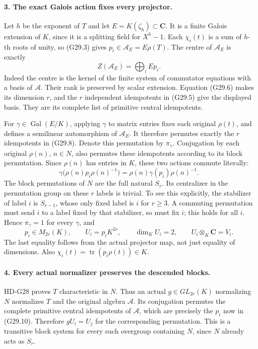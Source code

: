 \paragraph{3. The exact Galois action fixes every projector.}
Let \(h\) be the exponent of \(T\) and let
\(E=K(\zeta_h)\subset\mathbf C\). It is a finite Galois
extension of \(K\), since it is a splitting field for
\(X^h-1\). Each \(\chi_i(t)\) is a sum of \(h\)-th
roots of unity, so (G29.3) gives
\(p_i\in\mathcal A_E=E\rho(T)\).
The centre of \(\mathcal A_E\) is exactly
\[
                         Z(\mathcal A_E)=\bigoplus_i E p_i.
                                                               \tag{G29.8}
\]
Indeed the centre is the kernel of the finite system of
commutator equations with a basis of \(\mathcal A\).
Their rank is preserved by scalar extension. Equation
(G29.6) makes its dimension \(r\), and the \(r\)
independent idempotents in (G29.5) give the displayed basis.
They are its complete list of primitive central idempotents.

For \(\gamma\in\operatorname{Gal}(E/K)\), applying
\(\gamma\) to matrix entries fixes each original
\(\rho(t)\), and defines a semilinear automorphism of
\(\mathcal A_E\). It therefore permutes exactly the
\(r\) idempotents in (G29.8). Denote this permutation
by \(\pi_\gamma\). Conjugation by each original
\(\rho(n)\), \(n\in N\), also permutes these idempotents
according to its block permutation. Since \(\rho(n)\)
has entries in \(K\), these two actions commute literally:
\[
 \gamma\bigl(\rho(n)p_i\rho(n)^{-1}\bigr)
       =\rho(n)\gamma(p_i)\rho(n)^{-1}.                    \tag{G29.9}
\]
The block permutations of \(N\) are the full natural
\(S_r\). Its centralizer in the permutation group on
these \(r\) labels is trivial. To see this explicitly,
the stabilizer of label \(i\) is \(S_{r-1}\), whose
only fixed label is \(i\) for \(r\ge3\). A commuting
permutation must send \(i\) to a label fixed by that
stabilizer, so must fix \(i\); this holds for all \(i\).
Hence \(\pi_\gamma=1\) for every \(\gamma\), and
\[
            p_i\in M_{2r}(K),\qquad
            U_i=p_iK^{2r},\qquad
            \dim_KU_i=2,\qquad U_i\otimes_K\mathbf C=V_i.
                                                               \tag{G29.10}
\]
The last equality follows from the actual projector map,
not just equality of dimensions. Also
\(\chi_i(t)=\operatorname{tr}(p_i\rho(t))\in K\).

\paragraph{4. Every actual normalizer preserves the descended blocks.}
HD-G28 proves \(T\) characteristic in \(N\).
Thus an actual \(g\in GL_{2r}(K)\) normalizing \(N\)
normalizes \(T\) and the original algebra \(\mathcal A\).
Its conjugation permutes the complete primitive central
idempotents of \(\mathcal A\), which are precisely the
\(p_i\) now in (G29.10). Therefore \(gU_i=U_j\) for
the corresponding permutation. This is a transitive block
system for every such overgroup containing \(N\), since
\(N\) already acts as \(S_r\).


